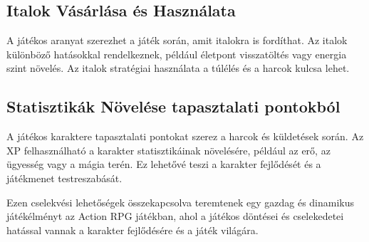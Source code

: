 \subsection{Italok Vásárlása és Használata}

A játékos aranyat szerezhet a játék során, amit italokra is fordíthat. Az italok különböző hatásokkal rendelkeznek, például életpont visszatöltés vagy energia szint növelés. Az italok stratégiai használata a túlélés és a harcok kulcsa lehet.

\subsection{Statisztikák Növelése tapasztalati pontokból}

A játékos karaktere tapasztalati pontokat szerez a harcok és küldetések során. Az XP felhasználható a karakter statisztikáinak növelésére, például az erő, az ügyesség vagy a mágia terén. Ez lehetővé teszi a karakter fejlődését és a játékmenet testreszabását.

Ezen cselekvési lehetőségek összekapcsolva teremtenek egy gazdag és dinamikus játékélményt az Action RPG játékban, ahol a játékos döntései és cselekedetei hatással vannak a karakter fejlődésére és a játék világára.



